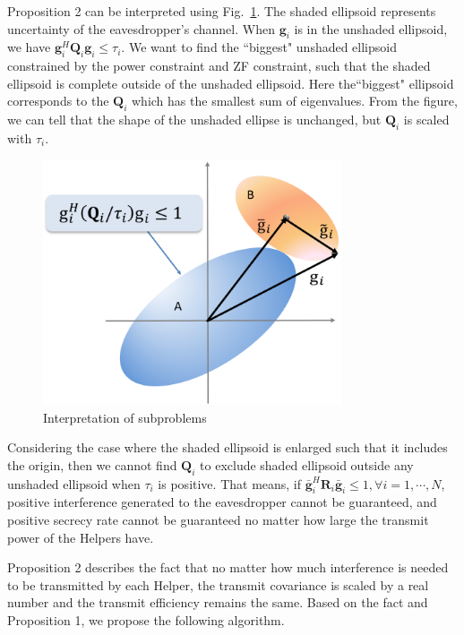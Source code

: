 \documentclass[conference]{IEEEtran}
\begin{document}
Proposition 2 can be interpreted using Fig.~\ref{fig:interpretation of subproblems}. The shaded ellipsoid represents uncertainty of the eavesdropper's channel. When $\mathbf{g}_i$ is in the unshaded ellipsoid, we have $\mathbf{g}_i^H\mathbf{Q}_i\mathbf{g}_i \leq  \tau_{i}$. We want to find the ``biggest" unshaded ellipsoid constrained by the power constraint and ZF constraint, such that the shaded ellipsoid is complete outside of the unshaded ellipsoid. Here the``biggest" ellipsoid corresponds to the $\mathbf{Q}_i$ which has the smallest sum of eigenvalues.  From the figure, we can tell that the shape of the unshaded ellipse is unchanged, but $\mathbf{Q}_i$ is scaled with $\tau_i$.
\begin{figure}[ht]
	\centering
	\includegraphics[width=8.8cm]{subproblem.png} %
	\caption{Interpretation of subproblems}
	\label{fig:interpretation of subproblems}
\end{figure}
Considering the case where the shaded ellipsoid is enlarged such that it includes the origin, then we cannot find $\mathbf{Q}_i$ to exclude shaded ellipsoid outside any unshaded ellipsoid when $\tau_i$ is positive. That means, if  $\bar{\mathbf{g}}_i^H\mathbf{R}_i\bar{\mathbf{g}}_i \leq 1, \forall i = 1, \cdots,N$, positive interference generated to the eavesdropper cannot be guaranteed, and positive secrecy rate cannot be guaranteed no matter how large the transmit power of the Helpers have.   


Proposition 2 describes the fact that no matter how much interference is needed to be transmitted by each Helper, the transmit covariance is scaled by a real number and the transmit efficiency remains the same.  Based on the fact and Proposition 1, we propose the following algorithm.
\end{document}

